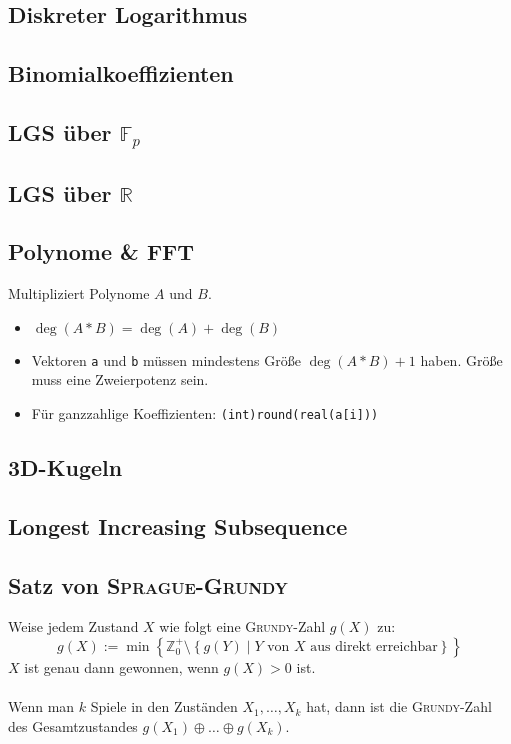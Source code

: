 \subsection{Diskreter Logarithmus}


\subsection{Binomialkoeffizienten}


\subsection{LGS über $\mathbb{F}_p$}


\subsection{LGS über $\mathbb{R}$}


\subsection{Polynome \& FFT}
Multipliziert Polynome $A$ und $B$.
\begin{itemize}[nosep]
	\item $\deg(A * B) = \deg(A) + \deg(B)$
	\item Vektoren \lstinline{a} und \lstinline{b} müssen mindestens Größe
	$\deg(A * B) + 1$ haben.
	Größe muss eine Zweierpotenz sein.
	\item Für ganzzahlige Koeffizienten: \lstinline{(int)round(real(a[i]))}
\end{itemize}


\subsection{3D-Kugeln}


\subsection{Longest Increasing Subsequence}


\subsection{Satz von \textsc{Sprague-Grundy}}
Weise jedem Zustand $X$ wie folgt eine \textsc{Grundy}-Zahl $g\left(X\right)$ zu:
\[
	g\left(X\right) := \min\left\{
		\mathbb{Z}_0^+ \setminus
		\left\{g\left(Y\right) \mid Y \text{ von } X \text{ aus direkt erreichbar}\right\}
	\right\} 
\]
$X$ ist genau dann gewonnen, wenn $g\left(X\right) > 0$ ist.\\\\
Wenn man $k$ Spiele in den Zuständen $X_1, \ldots, X_k$ hat, dann ist die \textsc{Grundy}-Zahl des Gesamtzustandes $g\left(X_1\right) \oplus \ldots \oplus g\left(X_k\right)$.

